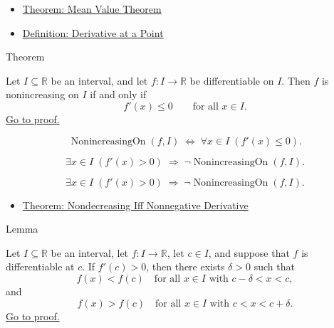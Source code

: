 \begin{remark*}[Dependencies]
\begin{itemize}
  \item \hyperref[thm:mean-value-theorem]{Theorem: Mean Value Theorem}
  \item \hyperref[def:derivative-at-a-point]{Definition: Derivative at a Point}
\end{itemize}
\end{remark*}


\begin{theorembox}{Theorem}
\begin{theorem}
\label{thm:nonincreasing-iff-nonpos-derivative}
Let $I \subseteq \mathbb{R}$ be an interval, and let $f : I \to \mathbb{R}$ be differentiable on $I$. Then $f$ is nonincreasing on $I$ if and only if
\[
f'(x) \leq 0 \qquad \text{for all } x \in I.
\]
\hyperref[prf:nonincreasing-iff-nonpos-derivative]{Go to proof.}
\end{theorem}
\end{theorembox}

\begin{remark*}
\[
\operatorname{NonincreasingOn}(f,I)
\;\iff\;
\forall x \in I\;(f'(x) \leq 0).
\]
\end{remark*}

\begin{remark*}
\[
\exists x \in I\;(f'(x) > 0) \;\Rightarrow\; \lnot\operatorname{NonincreasingOn}(f,I).
\]
\end{remark*}

\begin{remark*}
\[
\exists x \in I\;(f'(x) > 0) \;\Rightarrow\; \lnot\operatorname{NonincreasingOn}(f,I).
\]
\end{remark*}

\begin{remark*}[Dependencies]
\begin{itemize}
  \item \hyperref[thm:nondecreasing-iff-nonneg-derivative]{Theorem: Nondecreasing Iff Nonnegative Derivative}
\end{itemize}
\end{remark*}


\begin{lemmabox}{Lemma}
\begin{lemma}
\label{lem:positive-derivative-implies-locally-increasing}
Let $I \subseteq \mathbb{R}$ be an interval, let $f : I \to \mathbb{R}$, let $c \in I$, and suppose that $f$ is differentiable at $c$. If $f'(c) > 0$, then there exists $\delta > 0$ such that
\[
f(x) < f(c) \quad \text{for all } x \in I \text{ with } c - \delta < x < c,
\]
and
\[
f(x) > f(c) \quad \text{for all } x \in I \text{ with } c < x < c + \delta.
\]
\hyperref[prf:positive-derivative-implies-locally-increasing]{Go to proof.}
\end{lemma}
\end{lemmabox}

